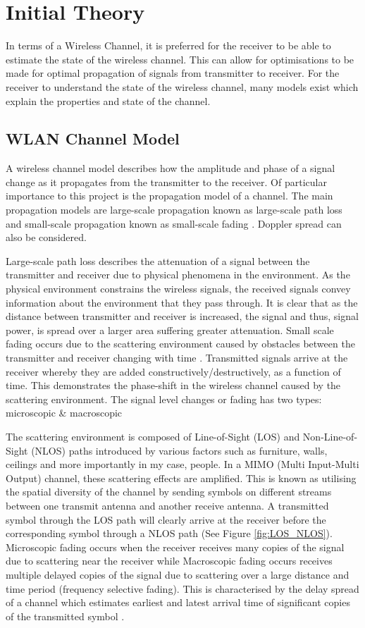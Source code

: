 \section{Initial Theory}
In terms of a Wireless Channel, it is preferred for the receiver to be able to estimate the state of the wireless channel. This can allow for optimisations to be made for optimal propagation of signals from transmitter to receiver. For the receiver to understand the state of the wireless channel, many models exist which explain the properties and state of the channel.
\subsection{WLAN Channel Model}
A wireless channel model describes how the amplitude and phase of a signal change as it propagates from the transmitter to the receiver. Of particular importance to this project is the propagation model of a channel. The main propagation models are large-scale propagation known as large-scale path loss and small-scale propagation known as small-scale fading \citep{articleWLAN}. Doppler spread can also be considered. \par
Large-scale path loss describes the attenuation of a signal between the transmitter and receiver due to physical phenomena in the environment. As the physical environment constrains the wireless signals, the received signals convey information about the environment that they pass through. It is clear that as the distance between transmitter and receiver is increased, the signal and thus, signal power, is spread over a larger area suffering greater attenuation. Small scale fading occurs due to the scattering environment caused by obstacles between the transmitter and receiver changing with time \citep{articleWLAN}. Transmitted signals arrive at the receiver whereby they are added constructively/destructively, as a function of time. This demonstrates the phase-shift in the wireless channel caused by the scattering environment. The signal level changes or fading has two types: microscopic \& macroscopic \citep{channelModels}\par
The scattering environment is composed of Line-of-Sight (LOS) and Non-Line-of-Sight (NLOS) paths introduced by various factors such as furniture, walls, ceilings and more importantly in my case, people. In a MIMO (Multi Input-Multi Output) channel, these scattering effects are amplified. This is known as utilising the spatial diversity of the channel by sending symbols on different streams between one transmit antenna and another receive antenna. A transmitted symbol through the LOS path will clearly arrive at the receiver before the corresponding symbol through a NLOS path (See Figure \ref{fig:LOS_NLOS}). Microscopic fading occurs when the receiver receives many copies of the signal due to scattering near the receiver while Macroscopic fading occurs receives multiple delayed copies of the signal due to scattering over a large distance and time period (frequency selective fading). This is characterised by the delay spread of a channel which estimates earliest and latest arrival time of significant copies of the transmitted symbol \citep{channelModels, articleWLAN}. \par
